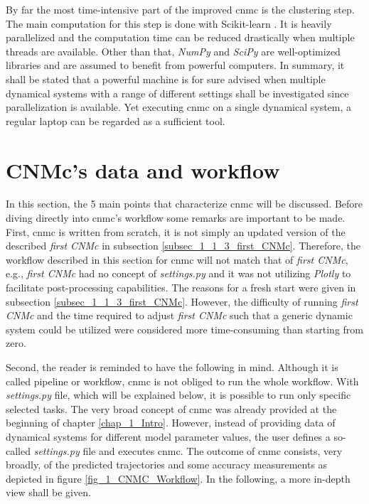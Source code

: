 By far the most time-intensive part of the improved \gls{cnmc} is the clustering step. The main computation for this step is done with
{Scikit-learn} \cite{scikit-learn}. It is heavily parallelized and the 
computation time can be reduced drastically when multiple threads are available.
Other than that, \emph{NumPy} and \emph{SciPy} are well-optimized libraries and 
are assumed to benefit from powerful computers. In summary, it shall be stated that a powerful machine is for sure advised when multiple dynamical 
systems with a range of different settings shall be investigated since parallelization is available. Yet executing \gls{cnmc} on a single dynamical system, a regular laptop can be regarded as 
a sufficient tool. 


\section{CNMc's data and workflow}
\label{sec_2_1_Workflow}
In this section, the 5 main points that characterize \gls{cnmc} will be discussed. 
Before diving directly into \gls{cnmc}'s workflow some remarks 
are important to be made.
First, \gls{cnmc} is written from scratch, it is not simply an updated version of the described \emph{first CNMc} in subsection
\ref{subsec_1_1_3_first_CNMc}.
Therefore, the workflow described in this section for \gls{cnmc} will not match that of \emph{first CNMc}, e.g., \emph{first CNMc} had no concept of \emph{settings.py} and it was not utilizing \emph{Plotly} \cite{plotly} to facilitate post-processing capabilities.
The reasons for a fresh start were given in subsection \ref{subsec_1_1_3_first_CNMc}.
However, the difficulty of running \emph{first CNMc} and the time required to adjust \emph{first CNMc} such that a generic dynamic system could be utilized were considered more time-consuming than starting from zero. \newline 

Second, the reader is reminded to have the following in mind. 
Although it is called pipeline or workflow, \gls{cnmc} is not obliged to run the whole workflow. With \emph{settings.py} file, which will be explained below, it is possible to run only specific selected tasks. 
The very broad concept of \gls{cnmc} was already provided at the beginning of chapter \ref{chap_1_Intro}.
However, instead of providing data of dynamical systems for different model parameter values, the user defines a so-called \emph{settings.py} file and executes \gls{cnmc}.
The outcome of \gls{cnmc} consists, very broadly, of the predicted trajectories and some accuracy measurements as depicted in figure 
\ref{fig_1_CNMC_Workflow}.
In the following, a more in-depth view shall be given.\newline 


